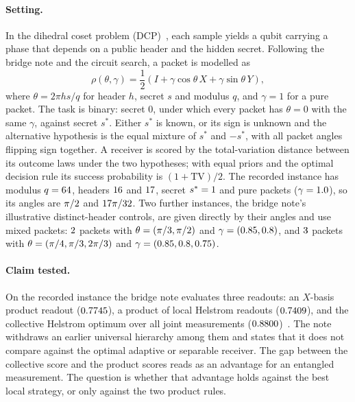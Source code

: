 \documentclass[10pt]{article}
\newcommand{\TV}{\mathrm{TV}}
\begin{document}
\paragraph{Setting.} In the dihedral coset problem (DCP)~\cite{Regev2004,Kuperberg2005}, each sample yields a qubit carrying a phase that depends on a public header and the hidden secret. Following the bridge note and the circuit search, a packet is modelled as
\[
\rho(\theta,\gamma) = \frac{1}{2}\left(I + \gamma\cos\theta\, X + \gamma\sin\theta\, Y\right),
\]
where $\theta = 2\pi h s/q$ for header $h$, secret $s$ and modulus $q$, and $\gamma=1$ for a pure packet. The task is binary: secret $0$, under which every packet has $\theta=0$ with the same $\gamma$, against secret $s^\ast$. Either $s^\ast$ is known, or its sign is unknown and the alternative hypothesis is the equal mixture of $s^\ast$ and $-s^\ast$, with all packet angles flipping sign together. A receiver is scored by the total-variation distance between its outcome laws under the two hypotheses; with equal priors and the optimal decision rule its success probability is $(1+\TV)/2$. The recorded instance has modulus $q=64$, headers $16$ and $17$, secret $s^\ast=1$ and pure packets ($\gamma=1.0$), so its angles are $\pi/2$ and $17\pi/32$. Two further instances, the bridge note's illustrative distinct-header controls, are given directly by their angles and use mixed packets: $2$ packets with $\theta=(\pi/3,\pi/2)$ and $\gamma=(0.85,0.8)$, and $3$ packets with $\theta=(\pi/4,\pi/3,2\pi/3)$ and $\gamma=(0.85,0.8,0.75)$.

\paragraph{Claim tested.} On the recorded instance the bridge note evaluates three readouts: an $X$-basis product readout ($0.7745$), a product of local Helstrom readouts ($0.7409$), and the collective Helstrom optimum over all joint measurements ($0.8800$)~\cite{Helstrom1976}. The note withdraws an earlier universal hierarchy among them and states that it does not compare against the optimal adaptive or separable receiver. The gap between the collective score and the product scores reads as an advantage for an entangled measurement. The question is whether that advantage holds against the best local strategy, or only against the two product rules.
\end{document}
